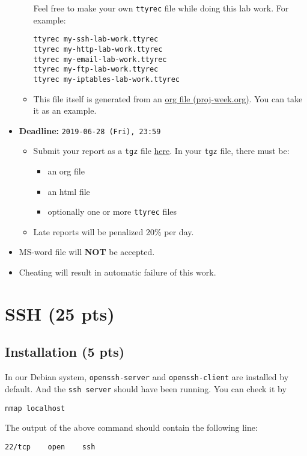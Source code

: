 \documentclass{article} [NO-DEFAULT-PACKAGES] \usepackage{wx672hyperref}
\begin{document}
\begin{itemize}
\begin{itemize}
Feel free to make your own \texttt{ttyrec} file while doing this lab work. For example:
\begin{verbatim}
ttyrec my-ssh-lab-work.ttyrec
ttyrec my-http-lab-work.ttyrec
ttyrec my-email-lab-work.ttyrec
ttyrec my-ftp-lab-work.ttyrec
ttyrec my-iptables-lab-work.ttyrec
\end{verbatim}
\item This file itself is generated from an \href{proj-week.org}{org file (proj-week.org)}. You can take it as an example.
\end{itemize}
\item \textbf{Deadline:} \texttt{2019-06-28 (Fri), 23:59}
\begin{itemize}
\item Submit your report as a \texttt{tgz} file \href{https://cs6.swfu.edu.cn/moodle/mod/assign/view.php?id=1548}{here}. In your \texttt{tgz} file, there must be:
\begin{itemize}
\item an org file
\item an html file
\item optionally one or more \texttt{ttyrec} files
\end{itemize}
\item Late reports will be penalized 20\% per day.
\end{itemize}
\item MS-word file will \textbf{NOT} be accepted.
\item Cheating will result in automatic failure of this work.
\end{itemize}
\section{SSH (25 pts)}
\label{sec:org1a9f2bc}
\subsection{Installation (5 pts)}
\label{sec:orgf20b822}
In our Debian system, \texttt{openssh-server} and \texttt{openssh-client} are installed by
default. And the \texttt{ssh server} should have been running. You can check it by
\begin{verbatim}
nmap localhost
\end{verbatim}

The output of the above command should contain the following line:
\begin{verbatim}
22/tcp    open    ssh
\end{verbatim}
\end{document}
